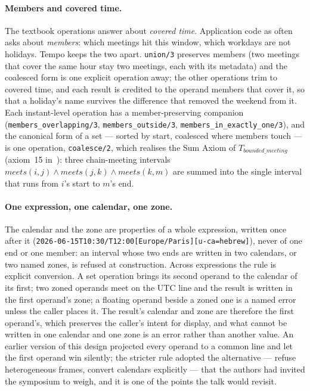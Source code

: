 \paragraph*{Members and covered time.} The textbook operations answer
about \emph{covered time}. Application code as often asks about
\emph{members}: which meetings hit this window, which workdays are not
holidays. Tempo keeps the two apart. \texttt{union/3} preserves
members (two meetings that cover the same hour stay two meetings, each
with its metadata) and the coalesced form is one explicit operation
away; the other operations trim to covered time, and each result is
credited to the operand members that cover it, so that a holiday's
name survives the difference that removed the weekend from it. Each
instant-level operation has a member-preserving companion
(\texttt{members\_overlapping/3}, \texttt{members\_outside/3},
\texttt{members\_in\_exactly\_one/3}), and the canonical form of a
set --- sorted by start, coalesced where members touch --- is one
operation, \texttt{coalesce/2}, which realises the Sum Axiom of
$T_{bounded\_meeting}$ (axiom~15 in~\cite{gruninger2017allenontology}):
three chain-meeting intervals
$\textit{meets}(i,j) \land \textit{meets}(j,k) \land \textit{meets}(k,m)$
are summed into the single interval that runs from $i$'s start to
$m$'s end.

\paragraph*{One expression, one calendar, one zone.} The calendar and
the zone are properties of a whole expression, written once after it
(\texttt{2026-06-15T10:30/T12:00[Europe/Paris][u-ca=hebrew]}), never of
one end or one member: an interval whose two ends are written in two
calendars, or two named zones, is refused at construction. Across
expressions the rule is explicit conversion. A set operation brings its
second operand to the calendar of its first; two zoned operands meet on
the UTC line and the result is written in the first operand's zone; a
floating operand beside a zoned one is a named error unless the caller
places it. The result's calendar and zone are therefore the first
operand's, which preserves the caller's intent for display, and what
cannot be written in one calendar and one zone is an error rather than
another value. An earlier version of this design projected every
operand to a common line and let the first operand win silently; the
stricter rule adopted the alternative --- refuse heterogeneous frames,
convert calendars explicitly --- that the authors had invited the
symposium to weigh, and it is one of the points the talk would revisit.

